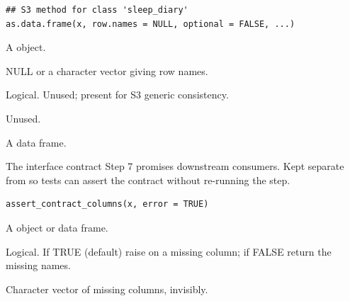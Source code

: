 \documentclass[a4paper]{book}
\begin{document}
%
\begin{Usage}
\begin{verbatim}
## S3 method for class 'sleep_diary'
as.data.frame(x, row.names = NULL, optional = FALSE, ...)
\end{verbatim}
\end{Usage}
%
\begin{Arguments}
\begin{ldescription}
\item[\code{x}] A  object.

\item[\code{row.names}] NULL or a character vector giving row names.

\item[\code{optional}] Logical. Unused; present for S3 generic consistency.

\item[\code{...}] Unused.
\end{ldescription}
\end{Arguments}
%
\begin{Value}
A data frame.
\end{Value}
%
\begin{Description}
The interface contract Step 7 promises downstream consumers. Kept separate
from  so tests can assert the contract without
re-running the step.
\end{Description}
%
\begin{Usage}
\begin{verbatim}
assert_contract_columns(x, error = TRUE)
\end{verbatim}
\end{Usage}
%
\begin{Arguments}
\begin{ldescription}
\item[\code{x}] A  object or data frame.

\item[\code{error}] Logical. If TRUE (default) raise on a missing column; if FALSE
return the missing names.
\end{ldescription}
\end{Arguments}
%
\begin{Value}
Character vector of missing columns, invisibly.
\end{Value}
\end{document}
